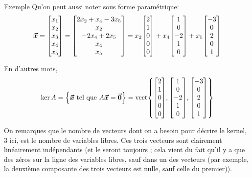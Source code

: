 \documentclass[a4paper]{article}
\begin{document}
\begin{parag}{Exemple}
    Qu'on peut aussi noter sous forme paramétrique:
    \[\bvec{x} = \begin{bmatrix} x_1 \\ x_2 \\ x_3 \\ x_4 \\ x_5 \end{bmatrix} = \begin{bmatrix} 2x_2 + x_4 - 3x_5 \\ x_2 \\ -2x_4 + 2x_5 \\ x_4 \\ x_5 \end{bmatrix} = x_2 \begin{bmatrix} 2 \\ 1 \\ 0 \\ 0 \\ 0 \end{bmatrix} + x_4 \begin{bmatrix} 1 \\ 0 \\ -2 \\ 1 \\ 0 \end{bmatrix} + x_5 \begin{bmatrix} -3 \\ 0 \\ 2 \\ 0 \\ 1 \end{bmatrix} \]

    En d'autres mots,
    \[\ker A = \left\{\bvec{x} \telque A \bvec{x} = \bvec{0}\right\} = \vect\left\{\begin{bmatrix} 2 \\ 1 \\ 0 \\ 0 \\ 0 \end{bmatrix}, \begin{bmatrix} 1 \\ 0 \\ -2 \\ 1 \\ 0 \end{bmatrix}, \begin{bmatrix} -3 \\ 0 \\ 2 \\ 0 \\ 1 \end{bmatrix} \right\}\]

    On remarques que le nombre de vecteurs dont on a besoin pour décrire le kernel, 3 ici, est le nombre de variables libres. Ces trois vecteurs sont clairement linéairement indépendants (et le seront toujours ; cela vient du fait qu'il y a que des zéros sur la ligne des variables libres, sauf dans un des vecteurs (par exemple, la deuxième composante des trois vecteurs est nulle, sauf celle du premier)).

\end{parag}
\end{document}
